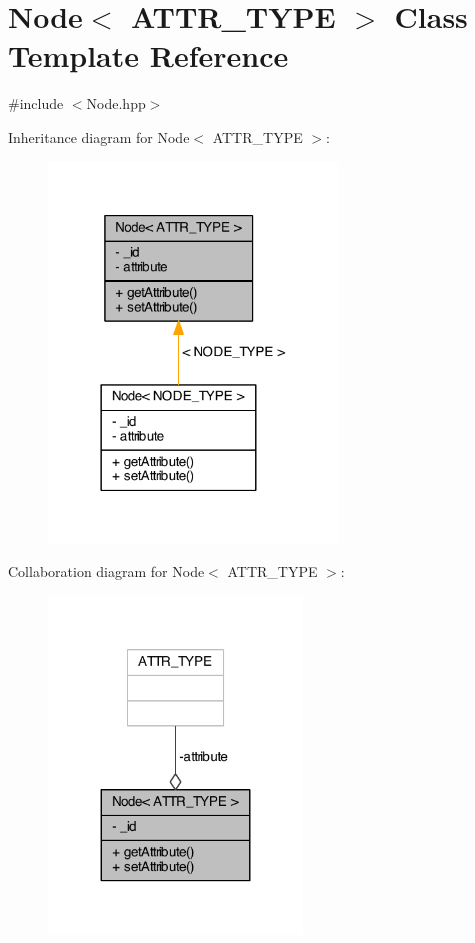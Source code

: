\hypertarget{class_node}{\section{Node$<$ A\+T\+T\+R\+\_\+\+T\+Y\+P\+E $>$ Class Template Reference}
\label{class_node}
}


{\ttfamily \#include $<$Node.\+hpp$>$}



Inheritance diagram for Node$<$ A\+T\+T\+R\+\_\+\+T\+Y\+P\+E $>$\+:\nopagebreak
\begin{figure}[H]
\begin{center}
\leavevmode
\includegraphics[width=218pt]{class_node__inherit__graph}
\end{center}
\end{figure}


Collaboration diagram for Node$<$ A\+T\+T\+R\+\_\+\+T\+Y\+P\+E $>$\+:\nopagebreak
\begin{figure}[H]
\begin{center}
\leavevmode
\includegraphics[width=191pt]{class_node__coll__graph}
\end{center}
\end{figure}
